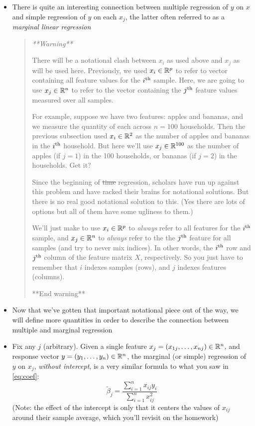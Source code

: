 \documentclass{article}
\begin{document}
\begin{itemize}
\item There is quite an interesting connection between multiple regression of
  $y$ on $x$ and simple regression of $y$ on each $x_j$, the latter often
  referred to as a \emph{marginal linear regression}

\begin{quote}\it
**Warning** 

There will be a notational clash between $x_i$ as used above and $x_j$ as will
be used here. Previously, we used $x_i \in \mathbb{R}^p$ to refer to vector containing
all feature values for the $i^{\textnormal{th}}$ sample. Here, we are going to use $x_j \in
\mathbb{R}^n$ to refer to the vector containing the $j^{\textnormal{th}}$ feature values measured over
all samples.       

For example, suppose we have two features: apples and bananas, and we measure
the quantity of each across $n = 100$ households. Then the previous subsection
used $x_i \in \mathbb{R}^2$ as the number of apples and bananas in the $i^{\textnormal{th}}$
household. But here we'll use $x_j \in \mathbb{R}^{100}$ as the number of apples (if
$j=1$) in the 100 households, or bananas (if $j=2$) in the households. Get it? 

Since the beginning of \sout{time} regression, scholars have run up against this
problem and have racked their brains for notational solutions. But there is no
real good notational solution to this. (Yes there are lots of options but all of
them have some ugliness to them.)

We'll just make to use $x_i \in \mathbb{R}^p$ to \emph{always} refer to all features for
the $i^{\textnormal{th}}$ sample, and $x_j \in \mathbb{R}^n$ to \emph{always} refer to the the $j^{\textnormal{th}}$
feature for all samples (and try to never mix indices). In other words, the
$i^{\textnormal{th}}$ row and $j^{\textnormal{th}}$ column of the feature matrix $X$, respectively. So you
just have to remember that $i$ indexes samples (rows), and $j$ indexes features
(columns). 

**End warning** 
\end{quote}

\item Now that we've gotten that important notational piece out of the way, we
  will define more quantities in order to describe the connection between
  multiple and marginal regression

\item Fix any $j$ (arbitrary). Given a single feature $x_j = (x_{1j}, \dots,
  x_{nj}) \in \mathbb{R}^n$, and response vector $y = (y_1, \dots, y_n) \in \mathbb{R}^n$, the 
  marginal (or simple) regression of $y$ on $x_j$, \emph{without intercept}, is
  a very similar formula to what you saw in \eqref{eq:coef}:
  \[
  \tilde\beta_j = \frac{\sum_{i=1}^n x_{ij} y_i}{\sum_{i=1}^n x_{ij}^2} 
  \]
  (Note: the effect of the intercept is only that it centers the values of
  $x_{ij}$ around their sample average, which you'll revisit on the homework)    


\end{itemize}
\end{document}
